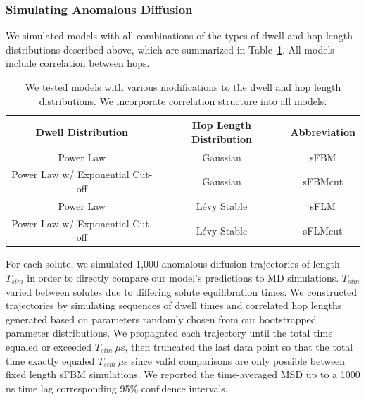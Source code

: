 \documentclass[12pt]{article}
\begin{document}
  
  \subsubsection*{Simulating Anomalous Diffusion}

  We simulated models with all combinations of the types of dwell and hop length
  distributions described above, which are summarized in Table~\ref{table:anomalous_models}.
  All models include correlation between hops.

  \begin{table}[!htb]
	  \centering
	  \begin{tabular}{|c|c|c|}
	  \hline
	  Dwell Distribution                & Hop Length Distribution & Abbreviation \\
	  \hline
      Power Law                         & Gaussian                & sFBM         \\
      Power Law w/ Exponential Cut-off  & Gaussian                & sFBMcut      \\
      Power Law                         & L\'evy Stable           & sFLM         \\
      Power Law w/ Exponential Cut-off  & L\'evy Stable           & sFLMcut      \\
	  \hline
	  \end{tabular}
	  \caption{We tested models with various modifications to the dwell and hop
	  length distributions. We incorporate correlation structure into all models.}\label{table:anomalous_models}
 \end{table}

  For each solute, we simulated 1,000 anomalous diffusion trajectories of length
  $T_{sim}$ in order to directly compare our model's predictions to MD simulations.
  $T_{sim}$ varied between solutes due to differing solute equilibration times. We constructed 
  trajectories by simulating sequences of dwell times and correlated hop lengths
  generated based on parameters randomly chosen from our bootstrapped parameter 
  distributions. We propagated each trajectory until the total time equaled or 
  exceeded $T_{sim}~ \mu$s, then truncated the last data point so that the total 
  time exactly equaled $T_{sim}~ \mu$s since valid comparisons are only possible 
  between fixed length sFBM simulations. 
  We reported the time-averaged MSD up to a 1000 ns time lag corresponding 95\% confidence
  intervals. 
  
\end{document}
